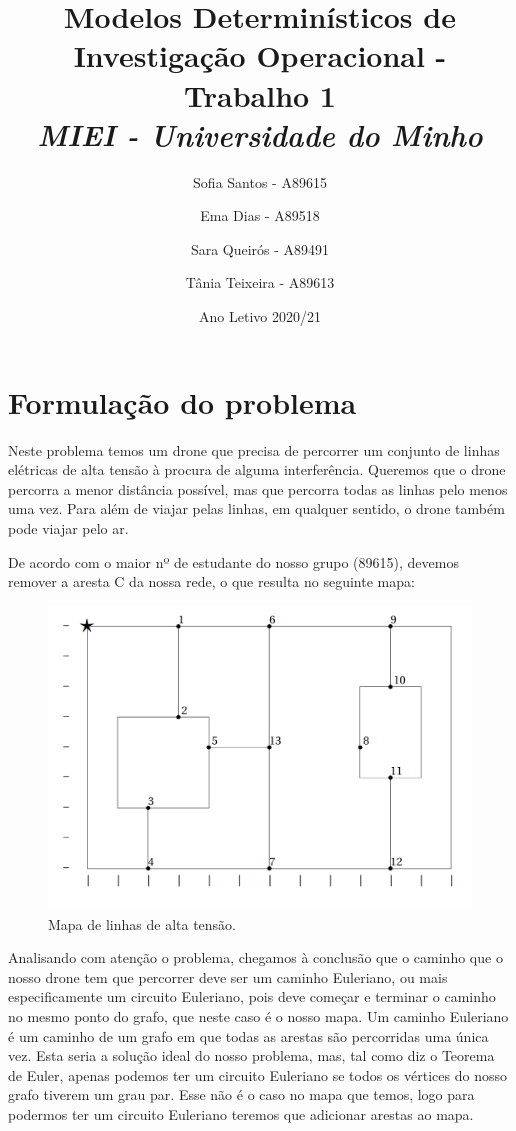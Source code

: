 \documentclass{article}
\begin{document}
\title{Modelos Determinísticos de Investigação Operacional - Trabalho 1\\
    \large\emph{MIEI - Universidade do Minho}}
\author{Sofia Santos - A89615 \and Ema Dias - A89518 \and
    Sara Queirós - A89491 \and Tânia Teixeira - A89613}

\date{Ano Letivo 2020/21}    

\maketitle

\newpage

\section{Formulação do problema}

Neste problema temos um drone que precisa de percorrer um conjunto de linhas elétricas de alta tensão à procura de alguma interferência. Queremos que o drone percorra a menor distância possível, mas que percorra todas as linhas pelo menos uma vez. Para além de viajar pelas linhas, em qualquer sentido, o drone também pode viajar pelo ar.

De acordo com o maior nº de estudante do nosso grupo (89615), devemos remover a aresta C da nossa rede, o que resulta no seguinte mapa:

\begin{figure}[h]
    \centering
    \includegraphics[width=0.8\linewidth]{fig1.png}
    \caption{Mapa de linhas de alta tensão.}
    \label{mapa}
\end{figure}

Analisando com atenção o problema, chegamos à conclusão que o caminho que o nosso drone tem que percorrer deve ser um caminho Euleriano, ou mais especificamente um circuito Euleriano, pois deve começar e terminar o caminho no mesmo ponto do grafo, que neste caso é o nosso mapa. Um caminho Euleriano é um caminho de um grafo em que todas as arestas são percorridas uma única vez. Esta seria a solução ideal do nosso problema, mas, tal como diz o Teorema de Euler, apenas podemos ter um circuito Euleriano se todos os vértices do nosso grafo tiverem um grau par. Esse não é o caso no mapa que temos, logo para podermos ter um circuito Euleriano teremos que adicionar arestas ao mapa.
\end{document}
